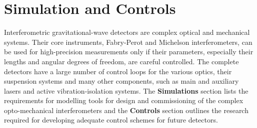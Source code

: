 \chapter{Simulation and Controls}
\label{sec:Sim_Controls}

\vspace{1.5cm}

Interferometric gravitational-wave detectors are complex optical and mechanical systems. Their core instruments, Fabry-Perot and Michelson interferometers, can be used for high-precision measurements only if their parameters, especially their lengths and angular degrees of freedom, are careful controlled. 
The complete detectors have a large number of control loops for the various optics, their suspension systems and many other components, such as main and auxiliary lasers and active vibration-isolation systems. 
The \textbf{Simulations} section lists the requirements for modelling tools for design and commissioning of the complex opto-mechanical interferometers and the \textbf{Controls} section outlines the research required for developing adequate control schemes for future detectors.

